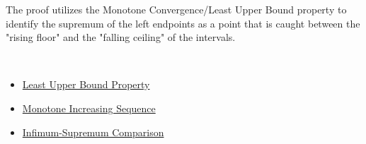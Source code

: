 \begin{remark*}
The proof utilizes the Monotone Convergence/Least Upper Bound property to identify the supremum of the left endpoints as a point that is caught between the "rising floor" and the "falling ceiling" of the intervals.
\end{remark*}

\begin{remark*}[Dependencies]~\\
\begin{itemize}
  \item \hyperref[pred:least-upper-bound-property]{Least Upper Bound Property}
  \item \hyperref[pred:monotone-increasing-sequence]{Monotone Increasing Sequence}
  \item \hyperref[thm:infimum-supremum-comparison]{Infimum-Supremum Comparison}
\end{itemize}
\end{remark*}